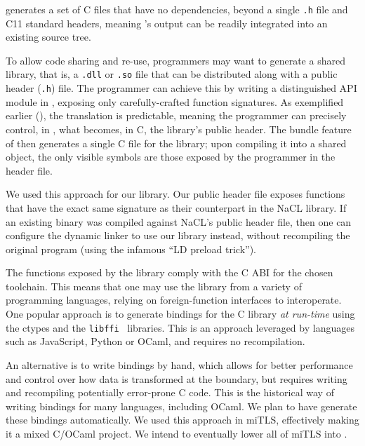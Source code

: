 \documentclass[acmsmall,review,anonymous]{acmart}\settopmatter{printfolios=true}
\let\li\lstinline
\begin{document}
\kremlin generates a set of C files that have
no dependencies, beyond a single \li+.h+ file and C11 standard headers, meaning
\kremlin's output can be readily integrated into an existing source tree.

To allow code sharing and re-use, programmers may want to generate a shared
library, that is, a \li+.dll+ or \li+.so+ file that can be distributed along
with a public header (\li+.h+) file. The programmer can achieve this by writing
a distinguished API module in \fstar, exposing only carefully-crafted function
signatures. As exemplified earlier (), the translation is
predictable, meaning the programmer can precisely control, in \fstar, what
becomes, in C, the library's public header. The
bundle feature of \kremlin then generates a single C file for the library;
upon compiling it into a shared object, the only visible symbols are those
exposed by the programmer in the header file.

We used this approach for our \haclstar library. Our public header file exposes
functions that have the exact same signature as their counterpart in the NaCL
library. If an existing binary was compiled against NaCL's public header file,
then one can configure the dynamic linker to use our \haclstar library instead,
without recompiling the original program (using the infamous ``LD preload trick'').

The functions exposed by the library comply with the C ABI for the chosen toolchain.
This means that one may use the library from a variety of programming languages,
relying on foreign-function interfaces to interoperate. One popular approach is
to generate bindings for the C library \emph{at run-time} using the ctypes
and the \li+libffi+~\cite{libffi} libraries. This is an approach leveraged by
languages such as JavaScript, Python or OCaml, and requires no recompilation.

An alternative is to write bindings by hand, which allows for better performance
and control over how data is transformed at the boundary, but requires writing
and recompiling potentially error-prone C code. This is the historical way of
writing bindings for many languages, including OCaml. We plan to have \kremlin
generate these bindings automatically. We used this approach in miTLS,
effectively making it a mixed C/OCaml project. We intend to eventually lower all
of miTLS into \lowstar.
\end{document}
